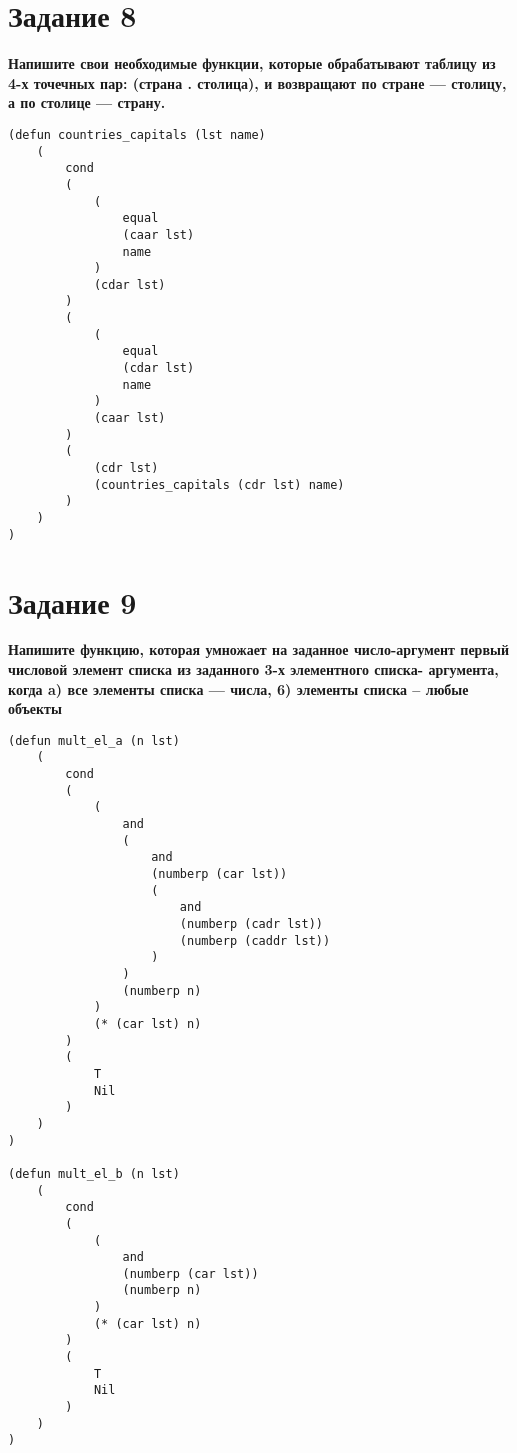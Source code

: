 \documentclass[a4paper,14pt, unknownkeysallowed]{extreport}
\begin{document}
\section*{Задание 8}

\textbf{Напишите свои необходимые функции, которые обрабатывают таблицу из 4-х точечных пар: (страна . столица), и возвращают по стране --- столицу, а по столице --- страну.}

\newpage

\begin{lstlisting}
(defun countries_capitals (lst name)
	(
		cond 
		(
			(
				equal
				(caar lst)
				name
			)
			(cdar lst)
		)
		(
			(
				equal
				(cdar lst)
				name
			)
			(caar lst)
		)
		(
			(cdr lst)
			(countries_capitals (cdr lst) name)
		)
	)
)
\end{lstlisting}

\section*{Задание 9}

\textbf{Напишите функцию, которая умножает на заданное число-аргумент первый числовой элемент списка из заданного 3-х элементного списка- аргумента, когда
	a) все элементы списка --- числа,
	6) элементы списка -- любые объекты}

\begin{lstlisting}
(defun mult_el_a (n lst)
	(
		cond 
		(
			(
				and
				(
					and
					(numberp (car lst))
					(
						and
						(numberp (cadr lst))
						(numberp (caddr lst))
					)
				)
				(numberp n)
			)
			(* (car lst) n)
		)
		(
			T 
			Nil
		)
	)
)

(defun mult_el_b (n lst)
	(
		cond 
		(
			(
				and
				(numberp (car lst))
				(numberp n)
			)
			(* (car lst) n)
		)
		(
			T 
			Nil
		)
	)
)
\end{lstlisting}
\end{document}
